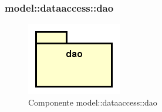 \documentclass[../DefinizioneDiProdotto.tex]{subfiles}
\begin{document}
\subsubsection{model::\-dataaccess::\-dao}

    \begin{figure}[H]
        \centering
        \includegraphics{img/package/dao.png}
        \caption{Componente model::\-dataaccess::\-dao}\label{fig:model::dataaccess::dao} 
    \end{figure}
\end{document}
